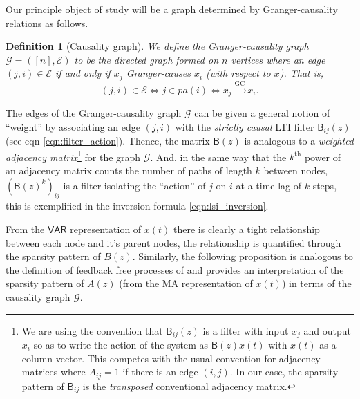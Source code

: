 \documentclass{statsoc}
\def\gc{\overset{\text{GC}}{\rightarrow}}  %
\def\gcg{\mathcal{G}}  %
\def\gcge{\mathcal{E}}  %
\def\VAR{\mathsf{VAR}}  %
\def\B{\mathsf{B}}  %
\newcommand{\pa}[1]{pa(#1)}  %
\newtheorem{definition}{Definition}
\begin{document}
Our principle object of study will be a graph determined by
Granger-causality relations as follows.

\begin{definition}[Causality graph]
  We define the Granger-causality graph $\gcg = ([n], \gcge)$ to be the directed
  graph formed on $n$ vertices where an edge $(j, i) \in \gcge$ if and
  only if $x_j$ Granger-causes $x_i$ (with respect to $x$).  That is,
  $$(j, i) \in \gcge \iff j \in \pa{i} \iff x_j \gc x_i.$$
\end{definition}

The edges of the Granger-causality graph $\gcg$ can be given a general
notion of ``weight'' by associating an edge $(j, i)$ with the
\textit{strictly causal} LTI filter $\B_{ij}(z)$ (see eqn
\eqref{eqn:filter_action}).  Thence, the matrix $\B(z)$ is analogous
to a \textit{weighted adjacency matrix}\footnote{\footnotesize We are using the
  convention that $\B_{ij}(z)$ is a filter with input $x_j$ and output
  $x_i$ so as to write the action of the system as $\B(z)x(t)$ with
  $x(t)$ as a column vector.  This competes with the usual convention
  for adjacency matrices where $A_{ij} = 1$ if there is an edge
  $(i, j)$.  In our case, the sparsity pattern of $\B_{ij}$ is the
  \textit{transposed} conventional adjacency matrix.} for the graph $\gcg$.  And,
in the same way that the $k^{\text{th}}$ power of an adjacency matrix
counts the number of paths of length $k$ between nodes,
$(\B(z)^k)_{ij}$ is a filter isolating the ``action'' of $j$ on $i$ at
a time lag of $k$ steps, this is exemplified in the inversion formula
\ref{eqn:lsi_inversion}.

From the $\VAR$ representation of $x(t)$ there is clearly a tight
relationship between each node and it's parent nodes, the relationship
is quantified through the sparsity pattern of $B(z)$.  Similarly, the
following proposition is analogous to the definition of feedback free
processes of \cite{caines1975feedback} and provides an interpretation
of the sparsity pattern of $A(z)$ (from the MA representation of
$x(t)$) in terms of the causality graph $\gcg$.
\end{document}
